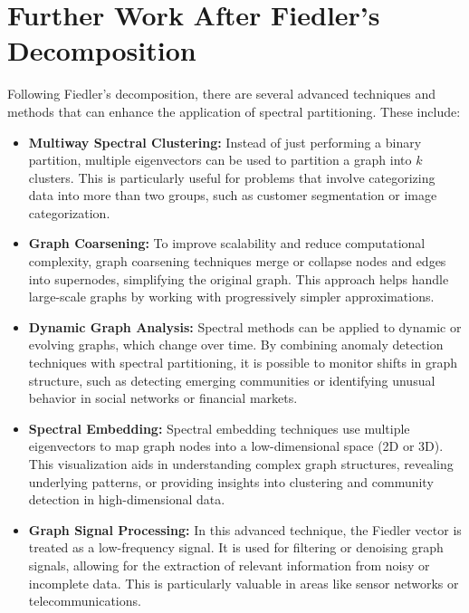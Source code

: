 \documentclass[hidelinks,12pt]{article}
\begin{document}
\section{Further Work After Fiedler's Decomposition}

Following Fiedler’s decomposition, there are several advanced techniques and methods that can enhance the application of spectral partitioning. These include:

\begin{itemize}
    \item \textbf{Multiway Spectral Clustering:} Instead of just performing a binary partition, multiple eigenvectors can be used to partition a graph into \( k \) clusters. This is particularly useful for problems that involve categorizing data into more than two groups, such as customer segmentation or image categorization.
    
    \item \textbf{Graph Coarsening:} To improve scalability and reduce computational complexity, graph coarsening techniques merge or collapse nodes and edges into supernodes, simplifying the original graph. This approach helps handle large-scale graphs by working with progressively simpler approximations.
    
    \item \textbf{Dynamic Graph Analysis:} Spectral methods can be applied to dynamic or evolving graphs, which change over time. By combining anomaly detection techniques with spectral partitioning, it is possible to monitor shifts in graph structure, such as detecting emerging communities or identifying unusual behavior in social networks or financial markets.
    
    \item \textbf{Spectral Embedding:} Spectral embedding techniques use multiple eigenvectors to map graph nodes into a low-dimensional space (2D or 3D). This visualization aids in understanding complex graph structures, revealing underlying patterns, or providing insights into clustering and community detection in high-dimensional data.
    
    \item \textbf{Graph Signal Processing:} In this advanced technique, the Fiedler vector is treated as a low-frequency signal. It is used for filtering or denoising graph signals, allowing for the extraction of relevant information from noisy or incomplete data. This is particularly valuable in areas like sensor networks or telecommunications.
\end{itemize}
\newpage
\end{document}
